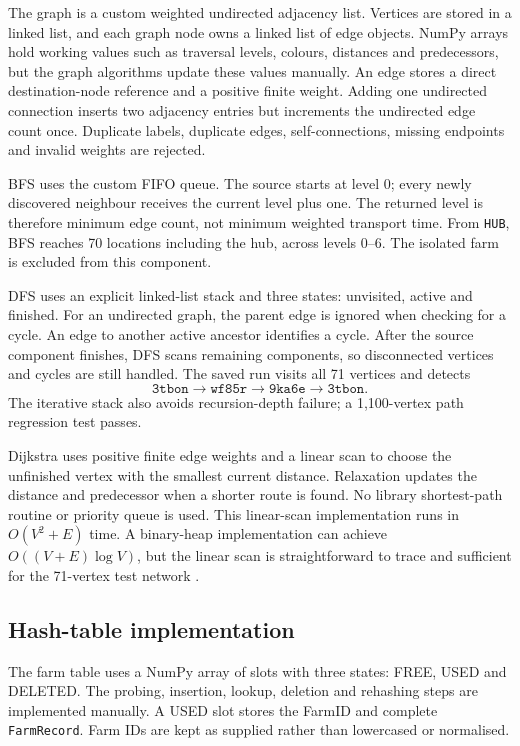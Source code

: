 \documentclass[10pt,a4paper]{article}
\begin{document}
The graph is a custom weighted undirected adjacency list. Vertices are stored in a linked list, and each graph node owns a linked list of edge objects. NumPy arrays hold working values such as traversal levels, colours, distances and predecessors, but the graph algorithms update these values manually. An edge stores a direct destination-node reference and a positive finite weight. Adding one undirected connection inserts two adjacency entries but increments the undirected edge count once. Duplicate labels, duplicate edges, self-connections, missing endpoints and invalid weights are rejected.

BFS uses the custom FIFO queue. The source starts at level 0; every newly discovered neighbour receives the current level plus one. The returned level is therefore minimum edge count, not minimum weighted transport time. From \texttt{HUB}, BFS reaches 70 locations including the hub, across levels 0--6. The isolated farm is excluded from this component.

DFS uses an explicit linked-list stack and three states: unvisited, active and finished. For an undirected graph, the parent edge is ignored when checking for a cycle. An edge to another active ancestor identifies a cycle. After the source component finishes, DFS scans remaining components, so disconnected vertices and cycles are still handled. The saved run visits all 71 vertices and detects
\[
\texttt{3tbon}\rightarrow\texttt{wf85r}\rightarrow\texttt{9ka6e}\rightarrow\texttt{3tbon}.
\]
The iterative stack also avoids recursion-depth failure; a 1,100-vertex path regression test passes.

Dijkstra uses positive finite edge weights and a linear scan to choose the unfinished vertex with the smallest current distance. Relaxation updates the distance and predecessor when a shorter route is found. No library shortest-path routine or priority queue is used. This linear-scan implementation runs in $O(V^2+E)$ time. A binary-heap implementation can achieve $O((V+E)\log V)$, but the linear scan is straightforward to trace and sufficient for the 71-vertex test network \cite{clrs2022}.


\subsection{Hash-table implementation}
\label{sec:hash}

The farm table uses a NumPy array of slots with three states: FREE, USED and DELETED. The probing, insertion, lookup, deletion and rehashing steps are implemented manually. A USED slot stores the FarmID and complete \texttt{FarmRecord}. Farm IDs are kept as supplied rather than lowercased or normalised.
\end{document}

